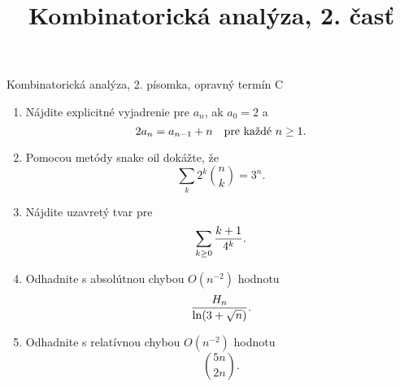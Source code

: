 \documentclass[a4paper, 12pt]{article}
\title{Kombinatorická analýza, 2. časť}
\date{}
\begin{document}
\centerline{Kombinatorická analýza, 2. písomka, opravný termín C}

\begin{enumerate}
\item
Nájdite explicitné vyjadrenie pre $a_n$, ak $a_0=2$ a
$$
2a_n = a_{n-1}+n\quad\hbox{pre každé $n\ge 1$}.
$$

\item
Pomocou metódy snake oil dokážte, že
$$
\sum_k 2^k{n\choose k}=3^n.
$$

\item
Nájdite uzavretý tvar pre
$$
\sum_{k\ge 0} {k+1\over 4^k}.
$$

\item
Odhadnite s absolútnou chybou $O(n^{-2})$ hodnotu
$$
{H_n\over \ln (3+\sqrt n)}.
$$

\item
Odhadnite s relatívnou chybou $O(n^{-2})$ hodnotu
$$
{5n\choose 2n}.
$$


\end{enumerate}
\end{document}

